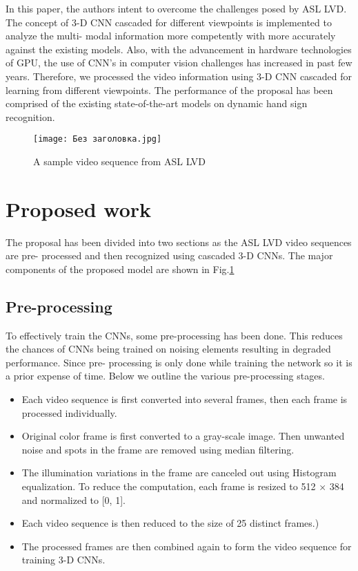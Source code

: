 \documentclass[
  manuscript=article,  %
  layout=preprint,  %
  year=20xx,
  volume=x,
]{joas}
\begin{document}
\par In this paper, the authors intent to overcome the challenges posed by ASL LVD. The concept of 3-D CNN cascaded for different viewpoints is implemented to analyze the multi- modal information more competently with more accurately against the existing models.
Also, with the advancement in hardware technologies of GPU, the use of CNN’s in computer vision challenges has increased in past few years. Therefore, we processed the video information using 3-D CNN cascaded for learning from different viewpoints. The performance of the proposal has been comprised of the existing state-of-the-art models on dynamic hand sign recognition.
\begin{figure}[h!]
    \centering
    \texttt{[image: Без заголовка.jpg]}
    \caption{A sample video sequence from ASL LVD}
    \label{f1}
\end{figure}







\section{Proposed work}\label{sec3}
The proposal has been divided into two sections as the ASL LVD video sequences are pre- processed and then recognized using cascaded 3-D CNNs. The major components of the proposed model are shown in Fig.\ref{f1}

\subsection{Pre-processing}\label{subsec2}
To effectively train the CNNs, some pre-processing has been done. This reduces the chances of CNNs being trained on noising elements resulting in degraded performance. Since pre- processing is only done while training the network so it is a prior expense of time. Below we outline the various pre-processing stages.


\begin{itemize}
  \item Each video sequence is first converted into several frames, then each frame is processed individually.
  \item Original color frame is first converted to a gray-scale image. Then unwanted noise and spots in the frame are removed using median filtering.
  \item The illumination variations in the frame are canceled out using Histogram equalization. To reduce the computation, each frame is resized to 512 × 384 and normalized to [0, 1].
  \item Each video sequence is then reduced to the size of 25 distinct frames.)
  \item The processed frames are then combined again to form the video sequence for training 3-D CNNs.
\end{itemize}
\end{document}
